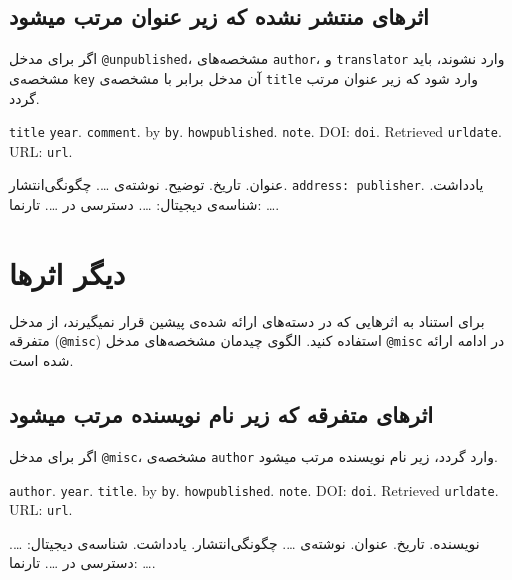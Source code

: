 \documentclass[a4paper,11pt]{article}
\begin{document}
\subsection{اثرهای منتشر نشده که زیر عنوان مرتب میشود}
اگر برای مدخل \verb|@unpublished|، مشخصه‌های \verb|author|، و \verb|translator| وارد نشوند، باید مشخصه‌ی \verb|key| آن مدخل برابر با مشخصه‌ی \verb|title| وارد شود که زیر عنوان مرتب گردد.

\begin{itemize}[nosep]
\begin{latin}
\item[] []
{\tt title} {\tt year}. {\tt comment}. by {\tt by}. {\tt howpublished}. {\tt note}. DOI: {\tt doi}. Retrieved {\tt urldate}. URL: {\tt url}. 
\end{latin}

\item[] []
{\persianttfamily عنوان}. {\persianttfamily تاریخ}. {\persianttfamily توضیح}. نوشته‌ی {\persianttfamily …}. {\persianttfamily چگونگی‌انتشار}. {\tt address: publisher}. {\persianttfamily یادداشت}. شناسه‌ی دیجیتال: {\persianttfamily …}. دسترسی در {\persianttfamily …}. تارنما: {\persianttfamily …}. 
\end{itemize}










\section{دیگر اثرها}
برای استناد به اثرهایی که در دسته‌های ارائه شده‌ی پیشین قرار نمیگیرند، از مدخل متفرقه (\verb|@misc|) استفاده کنید. الگوی چیدمان مشخصه‌های مدخل \verb|@misc| در ادامه ارائه شده است.





\subsection{اثرهای متفرقه که زیر نام نویسنده مرتب میشود}
اگر برای مدخل \verb|@misc|، مشخصه‌ی \verb|author| وارد گردد، زیر نام نویسنده مرتب میشود.

\begin{itemize}[nosep]
\begin{latin}
\item[] []
{\tt author}. {\tt year}. {\tt title}. by {\tt by}. {\tt howpublished}. {\tt note}. DOI: {\tt doi}. Retrieved {\tt urldate}. URL: {\tt url}. 
\end{latin}

\item[] []
{\persianttfamily نویسنده}. {\persianttfamily تاریخ}. {\persianttfamily عنوان}. نوشته‌ی {\persianttfamily …}. {\persianttfamily چگونگی‌انتشار}. {\persianttfamily یادداشت}. شناسه‌ی دیجیتال: {\persianttfamily …}. دسترسی در {\persianttfamily …}. تارنما: {\persianttfamily …}. 
\end{itemize}
\end{document}
